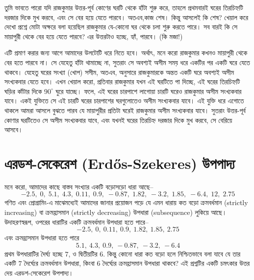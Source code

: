 \begin{solution}
	তুমি ভাবতে পারো যদি রাজকুমার উত্তর-পূর্ব কোণের ঘরটি থেকে হাঁটা শুরু করে, তাহলে প্রথমবারই ঘরের তিরচিহ্নটি দরজার দিকে মুখ করবে, এবং সে বের হয়ে যেতে পারবে। অতএব,কাজ শেষ। কিন্তু আসলেই কি শেষ? খেয়াল করে দেখো প্রশ্নে মোটা অক্ষরে বলা হয়েছিল রাজকুমার যে-কোনো ঘর থেকে চলা শুরু করতে পারে। সব বারই কি সে মায়াপুরী থেকে বের হয়ে যেতে পারবে? এর উত্তরটাও হচ্ছে, হ্যাঁ, পারবে। (কি মজা!)

	এটি প্রমাণ করার জন্য আগে আমাদের উলটোটি ধরে নিতে হবে। অর্থাৎ, মনে করো রাজকুমার কখনও মায়াপুরী থেকে বের হতে পারবে না। সে যেহেতু হাঁটা থামাচ্ছে না, সুতরাং সে অবশ্যই অসীম সময় ধরে একটির পর একটি ঘরে যেতে থাকবে। যেহেতু ঘরের সংখ্যা (খোপ) সসীম, অতএব, \phpname{} অনুসারে রাজকুমারকে অন্তত একটি ঘরে অবশ্যই অসীম সংখ্যকবার যেতে হবে। এখন খেয়াল করো, প্রতিবার রাজকুমার যখন এই ঘরটিতে পা দিচ্ছে, এই ঘরের তিরচিহ্নটি ঘড়ির কাঁটার দিকে $90^\circ$ ঘুরে যাচ্ছে। ফলে, এই ঘরের চারপাশে লাগোয়া চারটি ঘরেও রাজকুমার অসীম সংখ্যকবার যাবে। একই যুক্তিতে সে এই চারটি ঘরের চারপাশের ঘরগুলোতেও অসীম সংখ্যকবার যাবে। এই যুক্তি ধরে এগোতে থাকলে আমরা আসলে বুঝতে পারব যে মায়াপুরীর প্রতিটা ঘরেই রাজকুমার অসীম সংখ্যকবার যাবে। সুতরাং উত্তর-পূর্ব কোণার ঘরটিতেও সে অসীম সংখ্যকবার যাবে, এবং যখনই ঘরের তিরচিহ্ন দরজার দিকে মুখ করবে, সে বেরিয়ে আসবে।
\end{solution}

\section{এরডশ-সেকেরেশ (Erdős-Szekeres) উপপাদ্য}
মনে করো, আমাদের কাছে বাস্তব সংখ্যার একটি বড়োসড়ো ধারা আছে--
\[-2.5,\;0,\;5.1,\;4.3,\;0.11,\;0.9,\;-0.87,\;1.82,\;-3.2,\;1.85,\;-6.4,\;12,\;2.75\]
গণিত এবং প্রোগ্রামিং-এ মাঝেমধ্যেই আমাদের জানার প্রয়োজন পড়ে যে এমন ধারায় কত বড়ো ক্রমবর্ধমান (strictly increasing) বা ক্রমহ্রাসমান (strictly decreasing) উপধারা (subsequence) লুকিয়ে আছে। উদাহরণস্বরূপ, ওপরের ধারাটির একটি ক্রমবর্ধমান উপধারা হতে পারে--
\[-2.5,\ 0,\ 0.11,\ 0.9,\ 1.82,\ 1.85,\ 2.75\]
এবং ক্রমহ্রাসমান উপধারা হতে পারে
\[5.1,\ 4.3,\ 0.9,\ -0.87,\ -3.2,\ -6.4\]
প্রথম উপধারাটির দৈর্ঘ্য হচ্ছে $7$, ও দ্বিতীয়টির $6$. কিন্তু কোনো ধারা কত বড়ো হলে নিশ্চিতভাবে বলা যাবে যে তার একটি $7$ দৈর্ঘ্যের ক্রমবর্ধমান উপধারা, কিংবা $6$ দৈর্ঘ্যের ক্রমহ্রাসমান উপধারা থাকবে? এই প্রশ্নটির একটি চমৎকার উত্তর দেয় এরডশ-সেকেরেশ উপপাদ্য।

